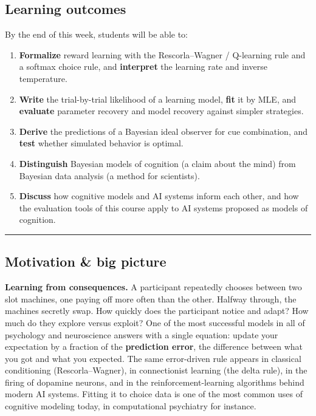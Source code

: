 \subsection{Learning outcomes}

By the end of this week, students will be able to:

\begin{enumerate}
\def\labelenumi{\arabic{enumi}.}
\tightlist
\item
  \textbf{Formalize} reward learning with the Rescorla--Wagner /
  Q-learning rule and a softmax choice rule, and \textbf{interpret} the
  learning rate and inverse temperature.
\item
  \textbf{Write} the trial-by-trial likelihood of a learning model,
  \textbf{fit} it by MLE, and \textbf{evaluate} parameter recovery and
  model recovery against simpler strategies.
\item
  \textbf{Derive} the predictions of a Bayesian ideal observer for cue
  combination, and \textbf{test} whether simulated behavior is optimal.
\item
  \textbf{Distinguish} Bayesian models of cognition (a claim about the
  mind) from Bayesian data analysis (a method for scientists).
\item
  \textbf{Discuss} how cognitive models and AI systems inform each
  other, and how the evaluation tools of this course apply to AI systems
  proposed as models of cognition.
\end{enumerate}

\begin{center}\rule{0.5\linewidth}{0.5pt}\end{center}

\subsection{Motivation \& big picture}

\textbf{Learning from consequences.} A participant repeatedly chooses
between two slot machines, one paying off more often than the other.
Halfway through, the machines secretly swap. How quickly does the
participant notice and adapt? How much do they explore versus exploit?
One of the most successful models in all of psychology and neuroscience
answers with a single equation: update your expectation by a fraction of
the \textbf{prediction error}, the difference between what you got and
what you expected. The same error-driven rule appears in classical
conditioning (Rescorla--Wagner), in connectionist learning (the delta
rule), in the firing of dopamine neurons, and in the
reinforcement-learning algorithms behind modern AI systems. Fitting it
to choice data is one of the most common uses of cognitive modeling
today, in computational psychiatry for instance.

